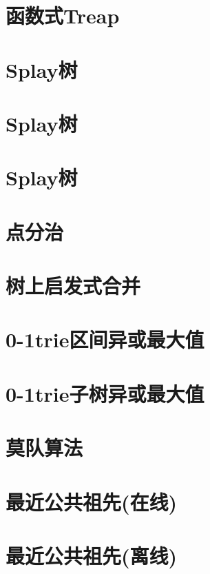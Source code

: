 \section{函数式Treap}
\raggedbottom
\hrulefill
\section{Splay树}
\raggedbottom
\hrulefill
\section{Splay树}
\raggedbottom
\hrulefill
\section{Splay树}
\raggedbottom
\hrulefill
\section{点分治}
\raggedbottom
\hrulefill
\section{树上启发式合并}
\raggedbottom
\hrulefill
\section{	0-1trie区间异或最大值}
\raggedbottom
\hrulefill
\section{	0-1trie子树异或最大值}
\raggedbottom
\hrulefill
\section{莫队算法}
\raggedbottom
\hrulefill
\section{最近公共祖先(在线)}
\raggedbottom
\hrulefill
\section{最近公共祖先(离线)}
\raggedbottom
\hrulefill
